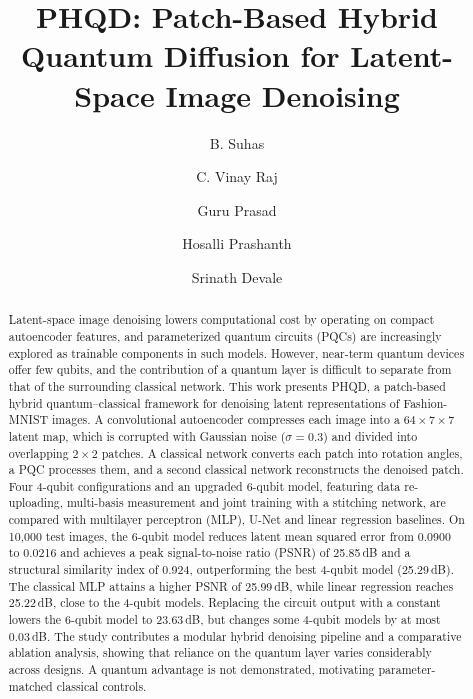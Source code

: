 \documentclass[runningheads]{llncs}
\begin{document}
\title{PHQD: Patch-Based Hybrid Quantum Diffusion for Latent-Space Image Denoising}

\author{B. Suhas \and C. Vinay Raj \and Guru Prasad \and Hosalli Prashanth \and Srinath Devale}

\maketitle

\begin{abstract}
Latent-space image denoising lowers computational cost by operating on compact autoencoder features, and parameterized quantum circuits (PQCs) are increasingly explored as trainable components in such models. However, near-term quantum devices offer few qubits, and the contribution of a quantum layer is difficult to separate from that of the surrounding classical network. This work presents PHQD, a patch-based hybrid quantum--classical framework for denoising latent representations of Fashion-MNIST images. A convolutional autoencoder compresses each image into a $64\times7\times7$ latent map, which is corrupted with Gaussian noise ($\sigma=0.3$) and divided into overlapping $2\times2$ patches. A classical network converts each patch into rotation angles, a PQC processes them, and a second classical network reconstructs the denoised patch. Four 4-qubit configurations and an upgraded 6-qubit model, featuring data re-uploading, multi-basis measurement and joint training with a stitching network, are compared with multilayer perceptron (MLP), U-Net and linear regression baselines. On 10,000 test images, the 6-qubit model reduces latent mean squared error from 0.0900 to 0.0216 and achieves a peak signal-to-noise ratio (PSNR) of 25.85\,dB and a structural similarity index of 0.924, outperforming the best 4-qubit model (25.29\,dB). The classical MLP attains a higher PSNR of 25.99\,dB, while linear regression reaches 25.22\,dB, close to the 4-qubit models. Replacing the circuit output with a constant lowers the 6-qubit model to 23.63\,dB, but changes some 4-qubit models by at most 0.03\,dB. The study contributes a modular hybrid denoising pipeline and a comparative ablation analysis, showing that reliance on the quantum layer varies considerably across designs. A quantum advantage is not demonstrated, motivating parameter-matched classical controls.

\end{abstract}
\end{document}
